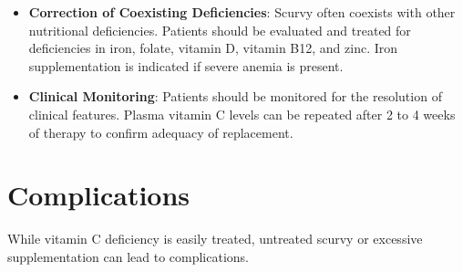 \begin{itemize}
\begin{itemize}
        \end{itemize}
    \item \textbf{Correction of Coexisting Deficiencies}: Scurvy often coexists with other nutritional deficiencies. Patients should be evaluated and treated for deficiencies in iron, folate, vitamin D, vitamin B12, and zinc. Iron supplementation is indicated if severe anemia is present.
    \item \textbf{Clinical Monitoring}: Patients should be monitored for the resolution of clinical features. Plasma vitamin C levels can be repeated after 2 to 4 weeks of therapy to confirm adequacy of replacement.
\end{itemize}

\section*{Complications}
While vitamin C deficiency is easily treated, untreated scurvy or excessive supplementation can lead to complications.


